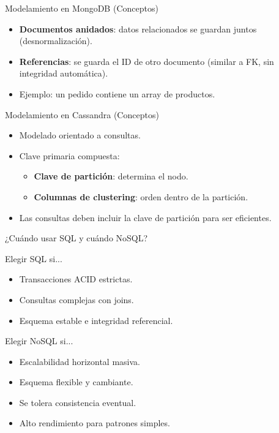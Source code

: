 \documentclass[aspectratio=169, 10pt, xcolor=table]{beamer}
\begin{document}
\begin{frame}{Modelamiento en MongoDB (Conceptos)}
    \begin{itemize}
        \item \textbf{Documentos anidados}: datos relacionados se guardan juntos (desnormalización).
        \item \textbf{Referencias}: se guarda el ID de otro documento (similar a FK, sin integridad automática).
        \item Ejemplo: un pedido contiene un array de productos.
    \end{itemize}
\end{frame}

\begin{frame}{Modelamiento en Cassandra (Conceptos)}
    \begin{itemize}
        \item Modelado orientado a consultas.
        \item Clave primaria compuesta:
        \begin{itemize}
            \item \textbf{Clave de partición}: determina el nodo.
            \item \textbf{Columnas de clustering}: orden dentro de la partición.
        \end{itemize}
        \item Las consultas deben incluir la clave de partición para ser eficientes.
    \end{itemize}
\end{frame}

\begin{frame}{¿Cuándo usar SQL y cuándo NoSQL?}
    \begin{block}{Elegir SQL si...}
        \begin{itemize}
            \item Transacciones ACID estrictas.
            \item Consultas complejas con joins.
            \item Esquema estable e integridad referencial.
        \end{itemize}
    \end{block}
    \begin{block}{Elegir NoSQL si...}
        \begin{itemize}
            \item Escalabilidad horizontal masiva.
            \item Esquema flexible y cambiante.
            \item Se tolera consistencia eventual.
            \item Alto rendimiento para patrones simples.
        \end{itemize}
    \end{block}
\end{frame}
\end{document}

